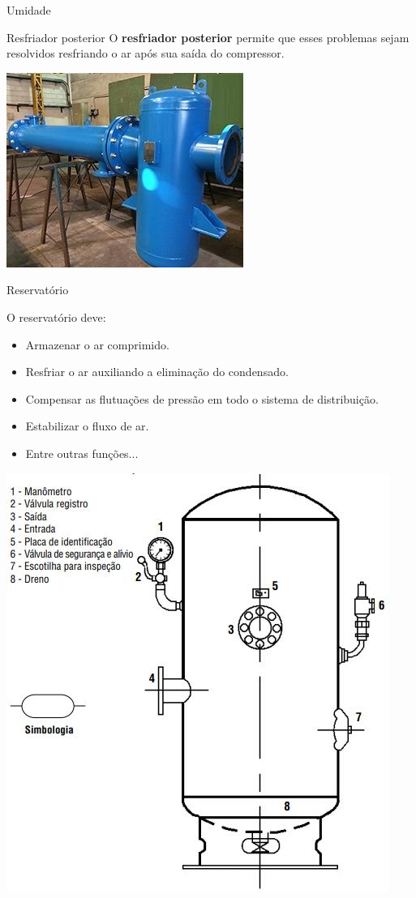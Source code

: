 \begin{frame}{Umidade}
	\begin{block}{Resfriador posterior}
		O \textbf{resfriador posterior} permite que esses problemas sejam resolvidos resfriando o ar após sua saída do compressor.
	\end{block}

	\centering
	\includegraphics[width=0.6\linewidth]{Figuras/Ch13/fig1}
\end{frame}


\begin{frame}{Reservatório}
	\begin{block}{}
		O reservatório deve:
		\begin{itemize}
			\item Armazenar o ar comprimido.
			\item Resfriar o ar auxiliando a eliminação do condensado.
			\item Compensar as flutuações de pressão em todo o sistema de distribuição.
			\item Estabilizar o fluxo de ar.
			\item Entre outras funções...
		\end{itemize}
	\end{block}
	
	\centering
	\includegraphics[height=0.5\textheight]{Figuras/Ch13/fig2}
\end{frame}


